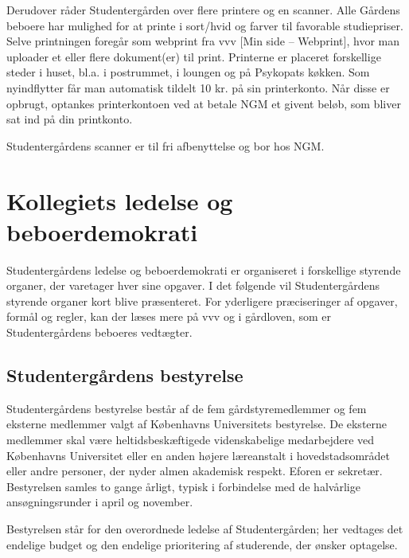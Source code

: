 \documentclass[11pt,article,twoside,openany,danish,extrafontsizes]{memoir} %
\begin{document}
Derudover råder Studentergården over flere printere og en scanner. Alle Gårdens beboere har mulighed for at printe i sort/hvid og farver til favorable studiepriser. Selve printningen foregår som webprint fra vvv [Min side -- Webprint], hvor man uploader et eller flere dokument(er) til print. Printerne er placeret forskellige steder i huset, bl.a. i postrummet, i loungen og på Psykopats køkken. Som nyindflytter får man automatisk tildelt 10 kr. på sin printerkonto. Når disse er opbrugt, optankes printerkontoen ved at betale NGM et givent beløb, som bliver sat ind på din printkonto.

Studentergårdens scanner er til fri afbenyttelse og bor hos NGM.



\clearpage



\chapter{Kollegiets ledelse og beboerdemokrati}
\label{chap:demokrati}
Studentergårdens ledelse og beboerdemokrati er organiseret i forskellige styrende organer, der varetager hver sine opgaver. I det følgende vil Studentergårdens styrende organer kort blive præsenteret. For yderligere præciseringer af opgaver, formål og regler, kan der læses mere på vvv og i gårdloven, som er Studentergårdens beboeres vedtægter.



\section{Studentergårdens bestyrelse}
Studentergårdens bestyrelse består af de fem gårdstyremedlemmer og fem eksterne medlemmer valgt af Københavns Universitets bestyrelse. De eksterne medlemmer skal være heltidsbeskæftigede videnskabelige medarbejdere ved Københavns Universitet eller en anden højere læreanstalt i hovedstadsområdet eller andre personer, der nyder almen akademisk respekt. Eforen er sekretær. Bestyrelsen samles to gange årligt, typisk i forbindelse med de halvårlige ansøgningsrunder i april og november.

Bestyrelsen står for den overordnede ledelse af Studentergården; her vedtages det endelige budget og den endelige prioritering af studerende, der ønsker optagelse.
\end{document}
